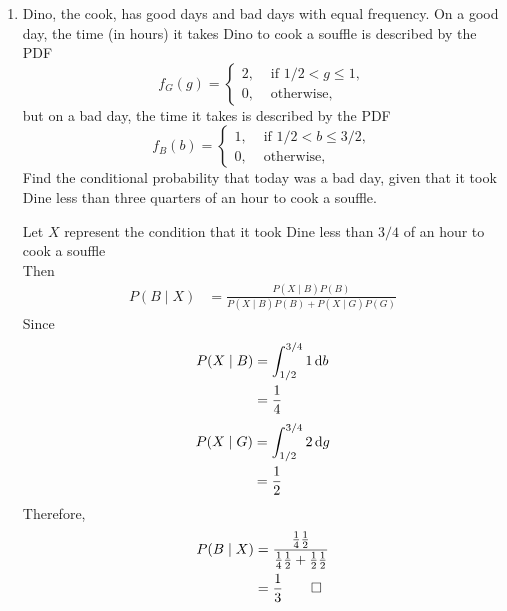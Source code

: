\documentclass[paper=usletter, fontsize=12pt]{article}
\begin{document}
\begin{enumerate}
        \item Dino, the cook, has good days and bad days with equal frequency.
        On a good day, the time (in hours) it takes Dino to cook a souffle is
        described by the PDF
        \begin{equation*}
            f_G(g) = \begin{cases}
                2, & \text{ if } 1/2 < g \le 1,\\
                0, & \text{ otherwise, }
            \end{cases}
        \end{equation*}
        but on a bad day, the time it takes is described by the PDF
        \begin{equation*}
            f_B(b) = \begin{cases}
                1, & \text{ if } 1/2 < b \le 3/2,\\
                0, & \text{ otherwise, }
            \end{cases}
        \end{equation*}
        Find the conditional probability that today was a bad day, given that
        it took Dine less than three quarters of an hour to cook a souffle.
        \begin{cproof}

            Let $X$ represent the condition that it took Dine less than $3/4$
            of an hour to cook a souffle\\
            Then
            \begin{align*}
                P(B \mid X) & = \frac{P(X \mid B)P(B)}{P(X \mid B)P(B) + P(X \mid G)P(G)}
            \end{align*}
            Since
            \begin{align*}
                P(X \mid B) &= \int_{1/2}^{3/4}1\mathop{}\!\mathrm{d} b\\
                & = \frac{1}{4}
            \end{align*}
            \endgroup
            \begin{align*}
                P(X \mid G) &= \int_{1/2}^{3/4}2\mathop{}\!\mathrm{d} g\\
                & = \frac{1}{2}
            \end{align*}
            \endgroup
            Therefore,
            \begin{align*}
                P(B \mid X) & = \frac{\frac{1}{4}\frac{1}{2}}{\frac{1}{4}\frac{1}{2} + \frac{1}{2}\frac{1}{2}}\\
                & = \frac{1}{3} \qedhere
            \end{align*}
            \endgroup


\end{cproof}
\end{enumerate}
\end{document}
